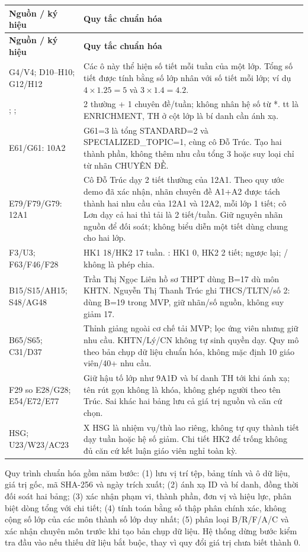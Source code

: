 \documentclass[12pt,a4paper]{report}
\newcommand{\code}[1]{\texttt{\detokenize{#1}}}
\begin{document}
\begin{longtable}{|p{3.5cm}|p{10.4cm}|}
\hline
\textbf{Nguồn / ký hiệu} & \textbf{Quy tắc chuẩn hóa} \\\hline
\endfirsthead
\hline
\textbf{Nguồn / ký hiệu} & \textbf{Quy tắc chuẩn hóa} \\\hline
\endhead
G4/V4; D10--H10; G12/H12 & Các ô này thể hiện số tiết mỗi tuần của một lớp. Tổng số tiết được tính bằng số lớp nhân với số tiết mỗi lớp; ví dụ $4\times1.25=5$ và $3\times1.4=4.2$. \\\hline
\code{2+1*}; \code{tt}; \code{TH} & 2 thường + 1 chuyên đề/tuần; không nhân hệ số từ *. tt là ENRICHMENT, TH ở cột lớp là bí danh cần ánh xạ. \\\hline
E61/G61: 10A2 & G61=3 là tổng STANDARD=2 và SPECIALIZED\_TOPIC=1, cùng cô Đỗ Trúc. Tạo hai thành phần, không thêm nhu cầu tổng 3 hoặc suy loại chỉ từ nhãn CHUYÊN ĐỀ. \\\hline
E79/F79/G79: 12A1 & Cô Đỗ Trúc dạy 2 tiết thường của 12A1. Theo quy ước demo đã xác nhận, nhãn chuyên đề A1+A2 được tách thành hai nhu cầu của 12A1 và 12A2, mỗi lớp 1 tiết; cô Lơn dạy cả hai thì tải là 2 tiết/tuần. Giữ nguyên nhãn nguồn để đối soát; không biểu diễn một tiết dùng chung cho hai lớp. \\\hline
F3/U3; F63/F46/F28 & HK1 18/HK2 17 tuần. \code{0/2}: HK1 0, HK2 2 tiết; \code{2/0} ngược lại; / không là phép chia. \\\hline
B15/S15/AH15; S48/AG48 & Trần Thị Ngọc Liên hồ sơ THPT dùng B=17 dù môn KHTN. Nguyễn Thị Thanh Trúc ghi THCS/TLTN/số 2: dùng B=19 trong MVP, giữ nhãn/số nguồn, không suy giảm 17. \\\hline
B65/S65; C31/D37 & Thỉnh giảng ngoài cơ chế tải MVP; lọc ứng viên nhưng giữ nhu cầu. KHTN/Lý/CN không tự sinh quyền dạy. Quy mô theo bản chụp dữ liệu chuẩn hóa, không mặc định 10 giáo viên/40+ nhu cầu. \\\hline
F29 so E28/G28; E54/E72/E77 & Giữ hậu tố lớp như 9A1Đ và bí danh TH tới khi ánh xạ; tên rút gọn không là khóa, không ghép người theo tên Trúc. Sai khác hai bảng lưu cả giá trị nguồn và căn cứ chọn. \\\hline
HSG; U23/W23/AC23 & X HSG là nhiệm vụ/thù lao riêng, không tự quy thành tiết dạy tuần hoặc hệ số giảm. Chi tiết HK2 để trống không đủ căn cứ kết luận giáo viên nghỉ toàn kỳ. \\\hline
\end{longtable}

Quy trình chuẩn hóa gồm năm bước: (1) lưu vị trí tệp, bảng tính và ô dữ liệu, giá trị gốc, mã SHA-256 và ngày trích xuất; (2) ánh xạ ID và bí danh, đồng thời đối soát hai bảng; (3) xác nhận phạm vi, thành phần, đơn vị và hiệu lực, phân biệt dòng tổng với chi tiết; (4) tính toán bằng số thập phân chính xác, không cộng số lớp của các môn thành số lớp duy nhất; (5) phân loại B/R/F/A/C và xác nhận chuyên môn trước khi tạo bản chụp dữ liệu. Hệ thống dừng bước kiểm tra đầu vào nếu thiếu dữ liệu bắt buộc, thay vì quy đổi giá trị chưa biết thành 0.
\end{document}
